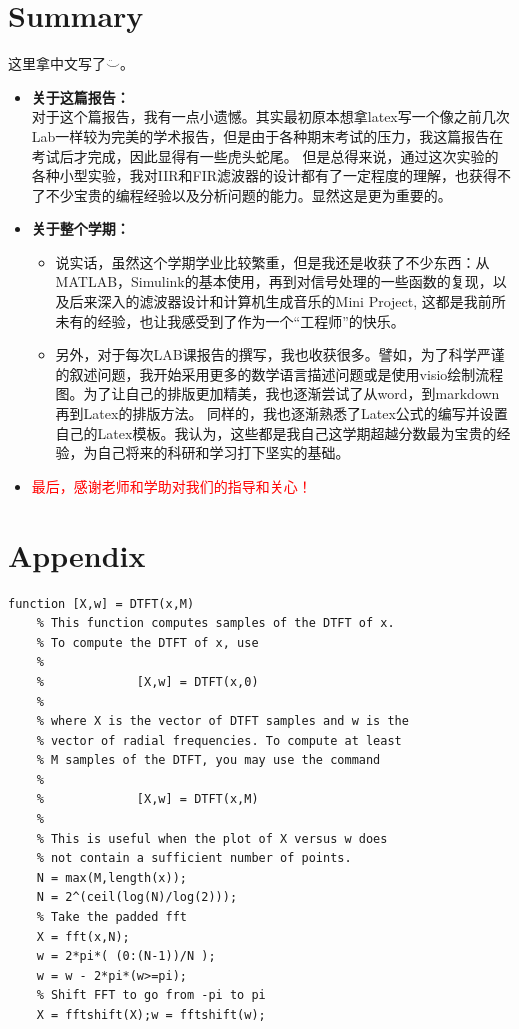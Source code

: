 \documentclass[onecolumn,oneside]{SUSTechHomework}
\begin{document}
\section*{Summary}
\begin{info}
	这里拿中文写了$\ddot\smile$。 
\end{info}  
\begin{itemize}
	\item \textbf{关于这篇报告：}
	\\对于这个篇报告，我有一点小遗憾。其实最初原本想拿latex写一个像之前几次Lab一样较为完美的学术报告，但是由于各种期末考试的压力，我这篇报告在考试后才完成，因此显得有一些虎头蛇尾。
	但是总得来说，通过这次实验的各种小型实验，我对IIR和FIR滤波器的设计都有了一定程度的理解，也获得不了不少宝贵的编程经验以及分析问题的能力。显然这是更为重要的。
	\item \textbf{关于整个学期：}
	\begin{itemize}
		\item 	说实话，虽然这个学期学业比较繁重，但是我还是收获了不少东西：从MATLAB，Simulink的基本使用，再到对信号处理的一些函数的复现，以及后来深入的滤波器设计和计算机生成音乐的Mini Project,
		这都是我前所未有的经验，也让我感受到了作为一个“工程师”的快乐。
		\item 另外，对于每次LAB课报告的撰写，我也收获很多。譬如，为了科学严谨的叙述问题，我开始采用更多的数学语言描述问题或是使用visio绘制流程图。为了让自己的排版更加精美，我也逐渐尝试了从word，到markdown再到Latex的排版方法。
		同样的，我也逐渐熟悉了Latex公式的编写并设置自己的Latex模板。我认为，这些都是我自己这学期超越分数最为宝贵的经验，为自己将来的科研和学习打下坚实的基础。
	\end{itemize}
	\item \textcolor{red}{最后，感谢老师和学助对我们的指导和关心！}
\end{itemize}
\section*{Appendix}
\begin{lstlisting}[title=DTFT.m]
	function [X,w] = DTFT(x,M)
	% This function computes samples of the DTFT of x. 
	% To compute the DTFT of x, use
	%
	%             [X,w] = DTFT(x,0)
	%
	% where X is the vector of DTFT samples and w is the 
	% vector of radial frequencies. To compute at least
	% M samples of the DTFT, you may use the command
	%
	%             [X,w] = DTFT(x,M)
	%
	% This is useful when the plot of X versus w does
	% not contain a sufficient number of points.
	N = max(M,length(x));
	N = 2^(ceil(log(N)/log(2)));
	% Take the padded fft
	X = fft(x,N);
	w = 2*pi*( (0:(N-1))/N );
	w = w - 2*pi*(w>=pi);
	% Shift FFT to go from -pi to pi
	X = fftshift(X);w = fftshift(w);	
\end{lstlisting}
\end{document}
